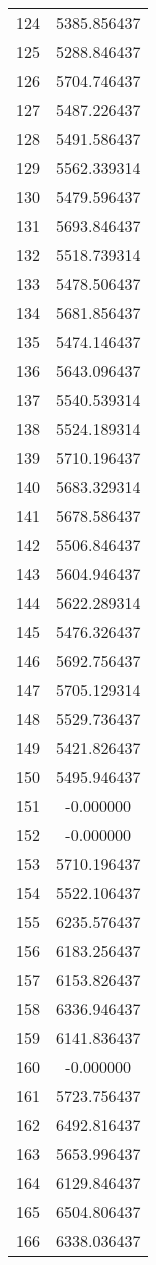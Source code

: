 \documentclass[12pt]{article}
\begin{document}
\begin{longtable}{@{}cc@{}}
124 & 5385.856437 \\
125 & 5288.846437 \\
126 & 5704.746437 \\
127 & 5487.226437 \\
128 & 5491.586437 \\
129 & 5562.339314 \\
130 & 5479.596437 \\
131 & 5693.846437 \\
132 & 5518.739314 \\
133 & 5478.506437 \\
134 & 5681.856437 \\
135 & 5474.146437 \\
136 & 5643.096437 \\
137 & 5540.539314 \\
138 & 5524.189314 \\
139 & 5710.196437 \\
140 & 5683.329314 \\
141 & 5678.586437 \\
142 & 5506.846437 \\
143 & 5604.946437 \\
144 & 5622.289314 \\
145 & 5476.326437 \\
146 & 5692.756437 \\
147 & 5705.129314 \\
148 & 5529.736437 \\
149 & 5421.826437 \\
150 & 5495.946437 \\
151 & -0.000000 \\
152 & -0.000000 \\
153 & 5710.196437 \\
154 & 5522.106437 \\
155 & 6235.576437 \\
156 & 6183.256437 \\
157 & 6153.826437 \\
158 & 6336.946437 \\
159 & 6141.836437 \\
160 & -0.000000 \\
161 & 5723.756437 \\
162 & 6492.816437 \\
163 & 5653.996437 \\
164 & 6129.846437 \\
165 & 6504.806437 \\
166 & 6338.036437 \\

\end{longtable}
\end{document}
